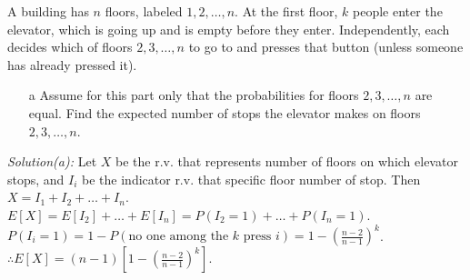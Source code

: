 \documentclass{beamer}
\newcommand{\ti}[1]{\textit{#1}}
\begin{document}

\begin{frame}
    \begin{example}[Exercise 4.43]
        A building has $n$ floors, labeled $1, 2, \dots, n$. At the first floor, $k$ people enter the elevator, which is going up and is empty before they enter. Independently, each decides which of floors $2, 3, \dots, n$ to go to and presses that button (unless someone has already pressed it).
        \begin{enumerate}
            \item[a] Assume for this part only that the probabilities for floors $2, 3, \dots, n$ are equal. Find the expected number of stops the elevator makes on floors $2, 3, \dots , n$.
        \end{enumerate}    
    \end{example}
    \ti{Solution(a):} Let $X$ be the r.v. that represents number of floors on which elevator stops, and $I_i$ be the indicator r.v. that specific floor number of stop. Then $X = I_1+I_2+\dots +I_n$. $E[X] = E[I_2] +\dots +E[I_n] =P(I_2=1) +\dots + P(I_n=1)$. $P(I_i=1) = 1 - P(\text{no one among the }k\text{ press }i) = 1- \left(\frac{n-2}{n-1} \right)^k$. $\therefore E[X] = (n-1) \left[1-\left(\frac{n-2}{n-1}\right)^k\right]$.
\end{frame}
\end{document}
